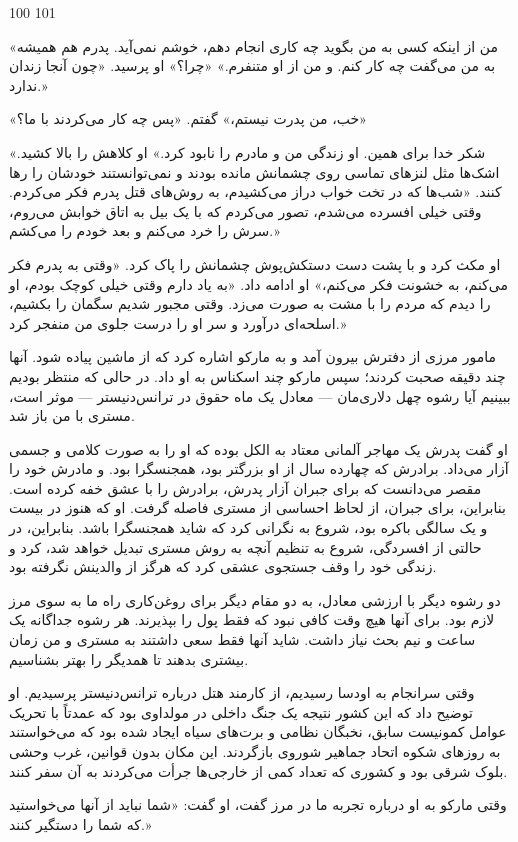100 101

«من از اینکه کسی به من بگوید چه کاری انجام دهم، خوشم نمی‌آید. پدرم هم همیشه به من می‌گفت چه کار کنم. و من از او متنفرم.» «چرا؟» او پرسید. «چون آنجا زندان ندارد.»

«خب، من پدرت نیستم،» گفتم. «پس چه کار می‌کردند با ما؟»

«شکر خدا برای همین. او زندگی من و مادرم را نابود کرد.» او کلاهش را بالا کشید. اشک‌ها مثل لنزهای تماسی روی چشمانش مانده بودند و نمی‌توانستند خودشان را رها کنند. «شب‌ها که در تخت خواب دراز می‌کشیدم، به روش‌های قتل پدرم فکر می‌کردم. وقتی خیلی افسرده می‌شدم، تصور می‌کردم که با یک بیل به اتاق خوابش می‌روم، سرش را خرد می‌کنم و بعد خودم را می‌کشم.»

او مکث کرد و با پشت دست دستکش‌پوش چشمانش را پاک کرد. «وقتی به پدرم فکر می‌کنم، به خشونت فکر می‌کنم،» او ادامه داد. «به یاد دارم وقتی خیلی کوچک بودم، او را دیدم که مردم را با مشت به صورت می‌زد. وقتی مجبور شدیم سگمان را بکشیم، اسلحه‌ای درآورد و سر او را درست جلوی من منفجر کرد.»

مامور مرزی از دفترش بیرون آمد و به مارکو اشاره کرد که از ماشین پیاده شود. آنها چند دقیقه صحبت کردند؛ سپس مارکو چند اسکناس به او داد. در حالی که منتظر بودیم ببینیم آیا رشوه چهل دلاری‌مان — معادل یک ماه حقوق در ترانس‌دنیستر — موثر است، مستری با من باز شد.

او گفت پدرش یک مهاجر آلمانی معتاد به الکل بوده که او را به صورت کلامی و جسمی آزار می‌داد. برادرش که چهارده سال از او بزرگتر بود، همجنسگرا بود. و مادرش خود را مقصر می‌دانست که برای جبران آزار پدرش، برادرش را با عشق خفه کرده است. بنابراین، برای جبران، از لحاظ احساسی از مستری فاصله گرفت. او که هنوز در بیست و یک سالگی باکره بود، شروع به نگرانی کرد که شاید همجنسگرا باشد. بنابراین، در حالتی از افسردگی، شروع به تنظیم آنچه به روش مستری تبدیل خواهد شد، کرد و زندگی خود را وقف جستجوی عشقی کرد که هرگز از والدینش نگرفته بود.

دو رشوه دیگر با ارزشی معادل، به دو مقام دیگر برای روغن‌کاری راه ما به سوی مرز لازم بود. برای آنها هیچ وقت کافی نبود که فقط پول را بپذیرند. هر رشوه جداگانه یک ساعت و نیم بحث نیاز داشت. شاید آنها فقط سعی داشتند به مستری و من زمان بیشتری بدهند تا همدیگر را بهتر بشناسیم.

وقتی سرانجام به اودسا رسیدیم، از کارمند هتل درباره ترانس‌دنیستر پرسیدیم. او توضیح داد که این کشور نتیجه یک جنگ داخلی در مولداوی بود که عمدتاً با تحریک عوامل کمونیست سابق، نخبگان نظامی و برت‌های سیاه ایجاد شده بود که می‌خواستند به روزهای شکوه اتحاد جماهیر شوروی بازگردند. این مکان بدون قوانین، غرب وحشی بلوک شرقی بود و کشوری که تعداد کمی از خارجی‌ها جرأت می‌کردند به آن سفر کنند.

وقتی مارکو به او درباره تجربه ما در مرز گفت، او گفت: «شما نباید از آنها می‌خواستید که شما را دستگیر کنند.»